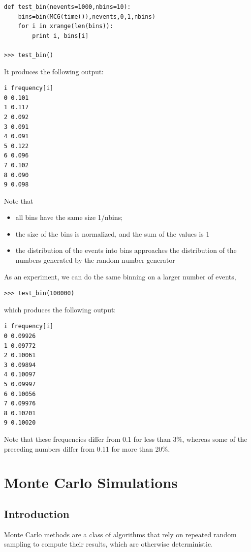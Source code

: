 \documentclass[justified,sixbynine]{tufte-book}
\theoremstyle{plain}%
\theoremstyle{definition}
\theoremstyle{remark}
\begin{document}
\begin{fullwidth}
\begin{lstlisting}
def test_bin(nevents=1000,nbins=10):
    bins=bin(MCG(time()),nevents,0,1,nbins)
    for i in xrange(len(bins)):
        print i, bins[i]

>>> test_bin()
\end{lstlisting}

It produces the following output:
\begin{lstlisting}
i frequency[i]
0 0.101
1 0.117
2 0.092
3 0.091
4 0.091
5 0.122
6 0.096
7 0.102
8 0.090
9 0.098
\end{lstlisting}

Note that

\begin{itemize}
\item  all bins have the same size 1/nbins;

\item  the size of the bins is normalized, and the sum of the values is 1

\item  the distribution of the events into bins approaches the distribution
of the numbers generated by the random number generator
\end{itemize}

As an experiment, we can do the same binning on a larger number of events,
\begin{lstlisting}
>>> test_bin(100000)
\end{lstlisting}

which produces the following output:
\begin{lstlisting}
i frequency[i]
0 0.09926
1 0.09772
2 0.10061
3 0.09894
4 0.10097
5 0.09997
6 0.10056
7 0.09976
8 0.10201
9 0.10020
\end{lstlisting}

Note that these frequencies differ from 0.1 for less than 3\%, whereas some of
the preceding numbers differ from 0.11 for more than 20\%.

\chapter{Monte Carlo Simulations}

\goodbreak\section{Introduction}

Monte Carlo methods are a class of algorithms that rely on repeated random sampling to compute their results, which are otherwise deterministic.


\end{fullwidth}
\end{document}
